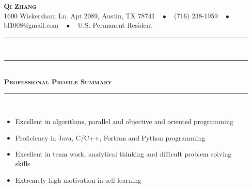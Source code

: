 \documentclass[11pt]{article}
\begin{document}
\begin{center}
{\Huge\textbf{\textsc{{Qi Zhang}}}} \\[5pt]
1600 Wickersham Ln. Apt 2089, Austin, TX 78741 $\text{ }\bullet\text{ }$ (716) 238-1959 $\text{ }\bullet\text{ }$  bl1008@gmail.com $\text{ }\bullet\text{ }$ U.S. Permanent Resident 
\end{center}
 \rule[0.8em]{\textwidth}{0.5pt} \\[-11pt]
 \rule[0.8em]{\textwidth}{0.5pt} \\[0pt]
\textbf{\textsc{\LARGE{Professional Profile Summary}}} \\ \rule[0.8em]{\textwidth}{0.5pt} \\[-20pt]
\begin{itemize}[topsep=0pt,partopsep=0pt,leftmargin=16pt]
\item Excellent in algorithms, parallel and objective and oriented programming
\item Proficiency in Java, C/C++, Fortran and Python programming
\item Excellent in team work, analytical thinking and difficult problem solving skills
\item Extremely high motivation in self-learning
\end{itemize}
\vspace{8pt}
\end{document}
